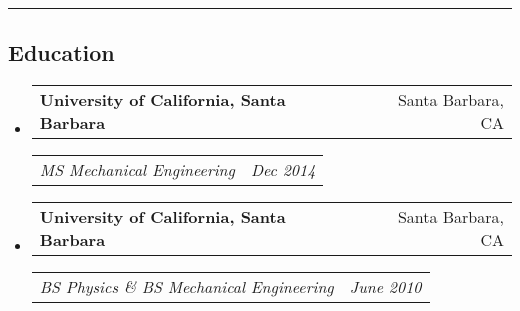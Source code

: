 \documentclass[10pt,letterpaper]{article}
\makeatletter
\newcommand{\headerrow}[2]{
\begin{tabular*}{\linewidth}{l@{\extracolsep{\fill}}r}
		#1 &
		#2 \\
	\end{tabular*}
}
\newcommand{\jobitem}[4]{\item \headerrow{\textbf{#1}}{#2}
\headerrow{\emph{#3}}{\emph{#4}}}
\makeatother
\begin{document}
\hrule
\subsection*{Education}
\begin{itemize}
	\jobitem{University of California, Santa Barbara}{Santa Barbara, CA}
		    {MS  Mechanical Engineering}{Dec 2014}
		    
	\jobitem{University of California, Santa Barbara}{Santa Barbara, CA}	
		    {BS Physics \&  BS Mechanical Engineering}{June 2010}
\end{itemize}
\end{document}
